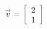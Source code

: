 \documentclass[preview]{standalone}
\begin{document}
\begin{align*}
\vec{v} = \begin{bmatrix} 2 \\ 1 \end{bmatrix}
\end{align*}
\end{document}

